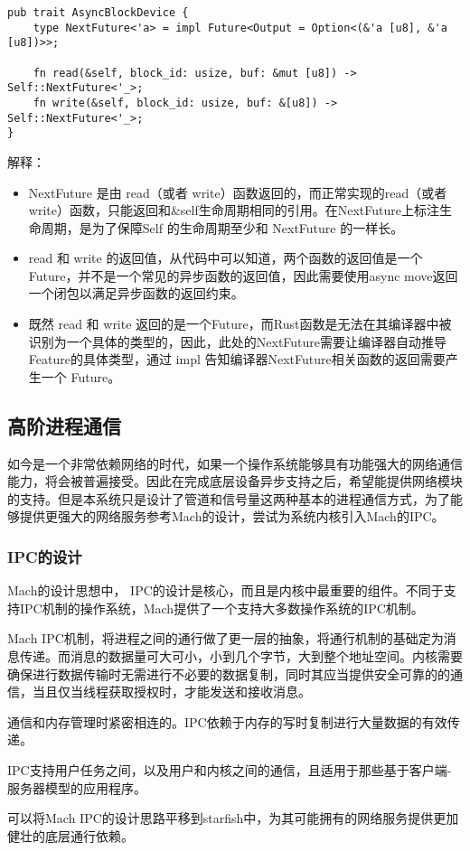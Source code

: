 \begin{lstlisting}[caption = AsyncBlockDevice的泛型异步接口]
pub trait AsyncBlockDevice {
    type NextFuture<'a> = impl Future<Output = Option<(&'a [u8], &'a [u8])>>;

    fn read(&self, block_id: usize, buf: &mut [u8]) -> Self::NextFuture<'_>;
    fn write(&self, block_id: usize, buf: &[u8]) -> Self::NextFuture<'_>;
}
\end{lstlisting}


解释：

\begin{itemize}
    \item NextFuture 是由 read（或者 write）函数返回的，而正常实现的read（或者 write）函数，只能返回和\&self生命周期相同的引用。在NextFuture上标注生命周期，是为了保障Self 的生命周期至少和 NextFuture 的一样长。
    \item read 和 write 的返回值，从代码中可以知道，两个函数的返回值是一个 Future，并不是一个常见的异步函数的返回值，因此需要使用async move返回一个闭包以满足异步函数的返回约束。
    \item 既然 read 和 write 返回的是一个Future，而Rust函数是无法在其编译器中被识别为一个具体的类型的，因此，此处的NextFuture需要让编译器自动推导Feature的具体类型，通过 impl 告知编译器NextFuture相关函数的返回需要产生一个	Future。
\end{itemize}

\subsection{高阶进程通信}

如今是一个非常依赖网络的时代，如果一个操作系统能够具有功能强大的网络通信能力，将会被普遍接受。因此在完成底层设备异步支持之后，希望能提供网络模块的支持。但是本系统只是设计了管道和信号量这两种基本的进程通信方式，为了能够提供更强大的网络服务参考Mach的设计，尝试为系统内核引入Mach的IPC。

\subsubsection*{IPC的设计}


Mach的设计思想中， IPC的设计是核心，而且是内核中最重要的组件。不同于支持IPC机制的操作系统，Mach提供了一个支持大多数操作系统的IPC机制。

Mach IPC机制，将进程之间的通行做了更一层的抽象，将通行机制的基础定为消息传递。而消息的数据量可大可小，小到几个字节，大到整个地址空间。内核需要确保进行数据传输时无需进行不必要的数据复制，同时其应当提供安全可靠的的通信，当且仅当线程获取授权时，才能发送和接收消息。

通信和内存管理时紧密相连的。IPC依赖于内存的写时复制进行大量数据的有效传递。

IPC支持用户任务之间，以及用户和内核之间的通信，且适用于那些基于客户端-服务器模型的应用程序。

可以将Mach IPC的设计思路平移到starfish中，为其可能拥有的网络服务提供更加健壮的底层通行依赖。